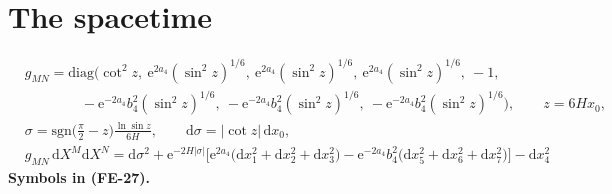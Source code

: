 \documentclass[
  10pt,
]{article}
\begin{document}
\hypertarget{the-spacetime}{%
\section{The spacetime}\label{the-spacetime}}

\[
\begin{aligned}
&g_{MN} = \mathrm{diag}\Big(\cot^2z,\ \mathrm{e}^{2a_4}(\sin^2z)^{1/6},\ \mathrm{e}^{2a_4}(\sin^2z)^{1/6},
 \ \mathrm{e}^{2a_4}(\sin^2z)^{1/6},\ -1,\\
&\qquad\qquad -\mathrm{e}^{-2a_4}b_4^2(\sin^2z)^{1/6},\ -\mathrm{e}^{-2a_4}b_4^2(\sin^2z)^{1/6},
 \ -\mathrm{e}^{-2a_4}b_4^2(\sin^2z)^{1/6}\Big),\qquad z = 6Hx_0,\\
&\sigma = \mathrm{sgn}\Big(\frac{\pi}{2} - z\Big)\frac{\ln\sin z}{6H},\qquad \mathrm{d}\sigma = \lvert\cot z\rvert\,\mathrm{d}x_0,\\
&g_{MN}\,\mathrm{d}X^M\mathrm{d}X^N = \mathrm{d}\sigma^2 + \mathrm{e}^{-2H\lvert\sigma\rvert}\Big[\mathrm{e}^{2a_4}\big(\mathrm{d}x_1^2
 + \mathrm{d}x_2^2 + \mathrm{d}x_3^2\big) - \mathrm{e}^{-2a_4}b_4^2\big(\mathrm{d}x_5^2 + \mathrm{d}x_6^2 + \mathrm{d}x_7^2\big)\Big]
 - \mathrm{d}x_4^2
\end{aligned} \tag{FE-27}
\] \textbf{Symbols in (FE-27).}
\end{document}
